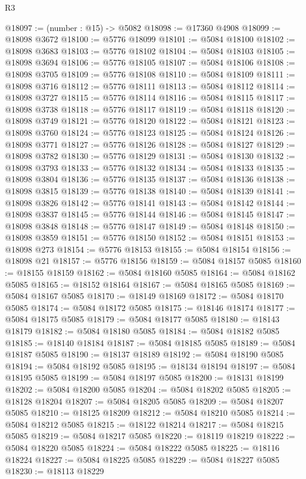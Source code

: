 \begin{lexlean}{R3}
\begin{coremodule}
@18097 := (number : @15) -> @5082
@18098 := @17360 @4908
@18099 := @18098 @3672
@18100 := @5776 @18099
@18101 := @5084 @18100
@18102 := @18098 @3683
@18103 := @5776 @18102
@18104 := @5084 @18103
@18105 := @18098 @3694
@18106 := @5776 @18105
@18107 := @5084 @18106
@18108 := @18098 @3705
@18109 := @5776 @18108
@18110 := @5084 @18109
@18111 := @18098 @3716
@18112 := @5776 @18111
@18113 := @5084 @18112
@18114 := @18098 @3727
@18115 := @5776 @18114
@18116 := @5084 @18115
@18117 := @18098 @3738
@18118 := @5776 @18117
@18119 := @5084 @18118
@18120 := @18098 @3749
@18121 := @5776 @18120
@18122 := @5084 @18121
@18123 := @18098 @3760
@18124 := @5776 @18123
@18125 := @5084 @18124
@18126 := @18098 @3771
@18127 := @5776 @18126
@18128 := @5084 @18127
@18129 := @18098 @3782
@18130 := @5776 @18129
@18131 := @5084 @18130
@18132 := @18098 @3793
@18133 := @5776 @18132
@18134 := @5084 @18133
@18135 := @18098 @3804
@18136 := @5776 @18135
@18137 := @5084 @18136
@18138 := @18098 @3815
@18139 := @5776 @18138
@18140 := @5084 @18139
@18141 := @18098 @3826
@18142 := @5776 @18141
@18143 := @5084 @18142
@18144 := @18098 @3837
@18145 := @5776 @18144
@18146 := @5084 @18145
@18147 := @18098 @3848
@18148 := @5776 @18147
@18149 := @5084 @18148
@18150 := @18098 @3859
@18151 := @5776 @18150
@18152 := @5084 @18151
@18153 := @18098 @273
@18154 := @5776 @18153
@18155 := @5084 @18154
@18156 := @18098 @21
@18157 := @5776 @18156
@18159 := @5084 @18157 @5085
@18160 := @18155 @18159
@18162 := @5084 @18160 @5085
@18164 := @5084 @18162 @5085
@18165 := @18152 @18164
@18167 := @5084 @18165 @5085
@18169 := @5084 @18167 @5085
@18170 := @18149 @18169
@18172 := @5084 @18170 @5085
@18174 := @5084 @18172 @5085
@18175 := @18146 @18174
@18177 := @5084 @18175 @5085
@18179 := @5084 @18177 @5085
@18180 := @18143 @18179
@18182 := @5084 @18180 @5085
@18184 := @5084 @18182 @5085
@18185 := @18140 @18184
@18187 := @5084 @18185 @5085
@18189 := @5084 @18187 @5085
@18190 := @18137 @18189
@18192 := @5084 @18190 @5085
@18194 := @5084 @18192 @5085
@18195 := @18134 @18194
@18197 := @5084 @18195 @5085
@18199 := @5084 @18197 @5085
@18200 := @18131 @18199
@18202 := @5084 @18200 @5085
@18204 := @5084 @18202 @5085
@18205 := @18128 @18204
@18207 := @5084 @18205 @5085
@18209 := @5084 @18207 @5085
@18210 := @18125 @18209
@18212 := @5084 @18210 @5085
@18214 := @5084 @18212 @5085
@18215 := @18122 @18214
@18217 := @5084 @18215 @5085
@18219 := @5084 @18217 @5085
@18220 := @18119 @18219
@18222 := @5084 @18220 @5085
@18224 := @5084 @18222 @5085
@18225 := @18116 @18224
@18227 := @5084 @18225 @5085
@18229 := @5084 @18227 @5085
@18230 := @18113 @18229

\end{coremodule}
\end{lexlean}
